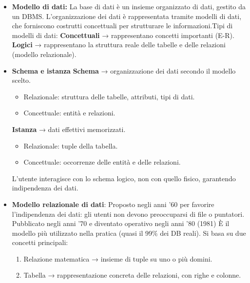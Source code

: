 \documentclass{article}
\begin{document}
\begin{itemize}
\item\textbf{Modello di dati:} La base di dati è un insieme organizzato di dati, gestito da un DBMS. L'organizzazione dei dati è rappresentata tramite modelli di dati, che forniscono costrutti concettuali per strutturare le informazioni.Tipi di modelli di dati: \textbf{Concettuali} → rappresentano concetti importanti (E-R). \textbf{Logici} → rappresentano la struttura reale delle tabelle e delle relazioni (modello relazionale).
\item \textbf{Schema e istanza}
\textbf{Schema} → organizzazione dei dati secondo il modello scelto. \begin{itemize}[label=$\diamond$]
    \item Relazionale: struttura delle tabelle, attributi, tipi di dati.
    \item Concettuale: entità e relazioni.
\end{itemize}
\textbf{Istanza} → dati effettivi memorizzati. \begin{itemize}[label=$\diamond$]
\item Relazionale: tuple della tabella.
\item Concettuale: occorrenze delle entità e delle relazioni.
\end{itemize}
L'utente interagisce con lo schema logico, non con quello fisico, garantendo indipendenza dei dati.
\item \textbf{Modello relazionale di dati}: Proposto negli anni '60 per favorire l'indipendenza dei dati: gli utenti non devono preoccuparsi di file o puntatori. Pubblicato negli anni '70 e diventato operativo negli anni '80 (1981) È il modello più utilizzato nella pratica (quasi il 99$\%$ dei DB reali). Si basa su due concetti principali: \begin{enumerate}
    \item Relazione matematica → insieme di tuple su uno o più domini.
    \item Tabella → rappresentazione concreta delle relazioni, con righe e colonne.
\end{enumerate}
\end{itemize}
\end{document}
